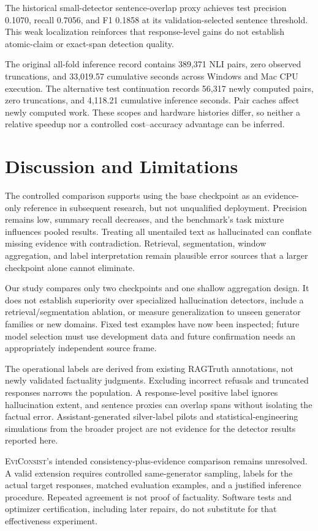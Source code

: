 \documentclass[conference,a4paper]{IEEEtran}
\newcommand{\method}{\textsc{EviConsist}}
\begin{document}
The historical small-detector sentence-overlap proxy achieves test precision 0.1070, recall 0.7056, and F1 0.1858 at its validation-selected sentence threshold. This weak localization reinforces that response-level gains do not establish atomic-claim or exact-span detection quality.

The original all-fold inference record contains 389,371 NLI pairs, zero observed truncations, and 33,019.57 cumulative seconds across Windows and Mac CPU execution. The alternative test continuation records 56,317 newly computed pairs, zero truncations, and 4,118.21 cumulative inference seconds. Pair caches affect newly computed work. These scopes and hardware histories differ, so neither a relative speedup nor a controlled cost--accuracy advantage can be inferred.

\section{Discussion and Limitations}
The controlled comparison supports using the base checkpoint as an evidence-only reference in subsequent research, but not unqualified deployment. Precision remains low, summary recall decreases, and the benchmark's task mixture influences pooled results. Treating all unentailed text as hallucinated can conflate missing evidence with contradiction. Retrieval, segmentation, window aggregation, and label interpretation remain plausible error sources that a larger checkpoint alone cannot eliminate.

Our study compares only two checkpoints and one shallow aggregation design. It does not establish superiority over specialized hallucination detectors, include a retrieval/segmentation ablation, or measure generalization to unseen generator families or new domains. Fixed test examples have now been inspected; future model selection must use development data and future confirmation needs an appropriately independent source frame.

The operational labels are derived from existing RAGTruth annotations, not newly validated factuality judgments. Excluding incorrect refusals and truncated responses narrows the population. A response-level positive label ignores hallucination extent, and sentence proxies can overlap spans without isolating the factual error. Assistant-generated silver-label pilots and statistical-engineering simulations from the broader project are not evidence for the detector results reported here.

\method's intended consistency-plus-evidence comparison remains unresolved. A valid extension requires controlled same-generator sampling, labels for the actual target responses, matched evaluation examples, and a justified inference procedure. Repeated agreement is not proof of factuality. Software tests and optimizer certification, including later repairs, do not substitute for that effectiveness experiment.
\end{document}
